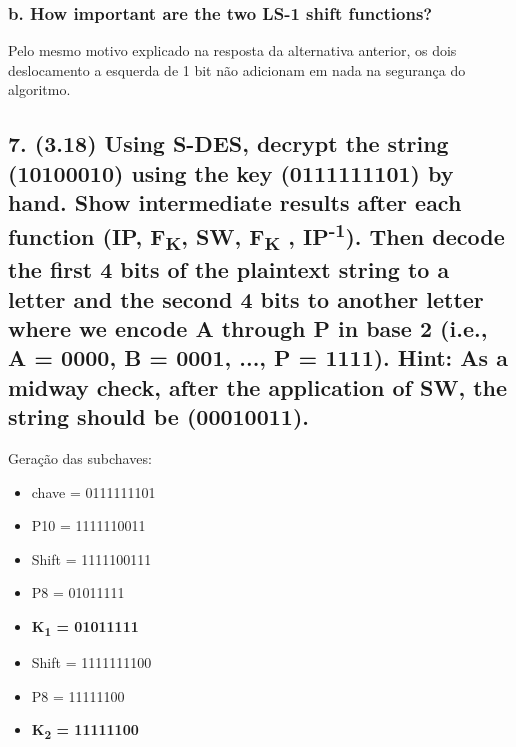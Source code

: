 \documentclass[12pt]{article}
\begin{document}
  \subsubsection*{b. How important are the two LS-1 shift functions?}

    Pelo mesmo motivo explicado na resposta da alternativa anterior, os dois
    deslocamento a esquerda de 1 bit não adicionam em nada na segurança do
    algoritmo.

\subsection*{7. (3.18) Using S-DES, decrypt the string (10100010) using the key
(0111111101) by hand. Show intermediate results after each function (IP,
F\textsubscript{K}, SW, F\textsubscript{K} , IP\textsuperscript{-1}). Then
decode the first 4 bits of the plaintext string to a letter and the second 4
bits to another letter where we encode A through P in base 2 (i.e., A = 0000, B
= 0001, ..., P = 1111). Hint: As a midway check, after the application of SW,
the string should be (00010011).}

  Geração das subchaves:
  \begin{itemize}
    \item chave = 0111111101
    \item P10 = 1111110011
    \item Shift = 1111100111
    \item P8 = 01011111
    \item \textbf{K\textsubscript{1} = 01011111}
    \item Shift = 1111111100
    \item P8 = 11111100
    \item \textbf{K\textsubscript{2} = 11111100}
  \end{itemize}
\end{document}
